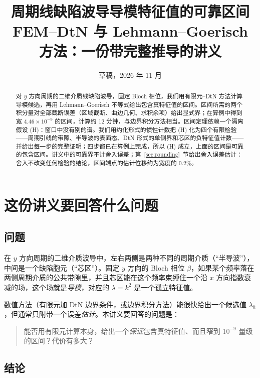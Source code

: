 \documentclass[11pt,a4paper,fontset=fandol]{ctexart}
\title{周期线缺陷波导导模特征值的可靠区间\\[2pt]\large FEM--DtN 与 Lehmann--Goerisch 方法：一份带完整推导的讲义}
\author{}
\date{草稿，2026 年 11 月}
\begin{document}
\maketitle

\begin{abstract}
对 $y$ 方向周期的二维介质线缺陷波导，固定 Bloch 相位，我们用有限元--DtN 方法计算导模候选，再用 Lehmann--Goerisch 不等式给出包含真特征值的区间。区间所需的两个积分量对全部截断误差（区域截断、曲边几何、求积余项）给出显式界；在算例中得到宽 $4.46\times10^{-9}$ 的区间，计算约 12 分钟，与边界积分方法相当。区间定理依赖一个隔离假设 (H)：窗口中没有别的谱。我们用约化形式的惯性计数把 (H) 化为四个有限检验——周期引线的带隙、半导波的表面态、DtN 形式的单侧界和芯区的负特征值计数——并给出每一步的完整证明；四步都已在算例上完成，所以 (H) 成立，上面的区间是可靠的包含区间。讲义中的可靠界不计舍入误差；第~\ref{sec:rounding}~节给出舍入误差估计：舍入不改变任何检验的结论，区间端点的估计位移约为宽度的 $0.2\%$。
\end{abstract}

\tableofcontents

\section{这份讲义要回答什么问题}
\label{sec:intro}
\subsection{问题}

在 $y$ 方向周期的二维介质波导中，左右两侧是两种不同的周期介质（“半导波”），中间是一个缺陷胞元（“芯区”）。固定 $y$ 方向的 Bloch 相位 $\beta$，如果某个频率落在两侧周期介质的公共带隙里，并且芯区能在这个频率束缚住一个沿 $x$ 方向指数衰减的场，这个场就是\emph{导模}，对应的 $\lambda=k^2$ 是一个孤立特征值。

数值方法（有限元加 DtN 边界条件，或边界积分方法）能很快给出一个候选值 $\lambda_h$，但通常只附带一个误差\emph{估计}。本讲义要回答的问题是：
\begin{quote}
能否用有限元计算本身，给出一个\emph{保证}包含真特征值、而且窄到 $10^{-9}$ 量级的区间？代价有多大？
\end{quote}

\subsection{结论}
\end{document}
